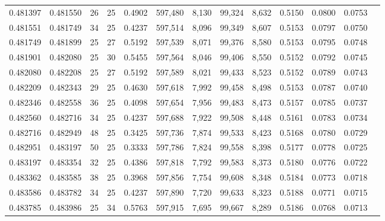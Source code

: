 \begin{tabular}{rrrrrrrrrrrrr}
0.481397 & 0.481550 &    26 &  25 &                                     0.4902 & 597,480 &   8,130 &  99,324 &   8,632 & 0.5150 & 0.0800 & 0.0753 \\
0.481551 & 0.481749 &    34 &  25 &                                     0.4237 & 597,514 &   8,096 &  99,349 &   8,607 & 0.5153 & 0.0797 & 0.0750 \\
0.481749 & 0.481899 &    25 &  27 &                                     0.5192 & 597,539 &   8,071 &  99,376 &   8,580 & 0.5153 & 0.0795 & 0.0748 \\
0.481901 & 0.482080 &    25 &  30 &                                     0.5455 & 597,564 &   8,046 &  99,406 &   8,550 & 0.5152 & 0.0792 & 0.0745 \\
0.482080 & 0.482208 &    25 &  27 &                                     0.5192 & 597,589 &   8,021 &  99,433 &   8,523 & 0.5152 & 0.0789 & 0.0743 \\
0.482209 & 0.482343 &    29 &  25 &                                     0.4630 & 597,618 &   7,992 &  99,458 &   8,498 & 0.5153 & 0.0787 & 0.0740 \\
0.482346 & 0.482558 &    36 &  25 &                                     0.4098 & 597,654 &   7,956 &  99,483 &   8,473 & 0.5157 & 0.0785 & 0.0737 \\
0.482560 & 0.482716 &    34 &  25 &                                     0.4237 & 597,688 &   7,922 &  99,508 &   8,448 & 0.5161 & 0.0783 & 0.0734 \\
0.482716 & 0.482949 &    48 &  25 &                                     0.3425 & 597,736 &   7,874 &  99,533 &   8,423 & 0.5168 & 0.0780 & 0.0729 \\
0.482951 & 0.483197 &    50 &  25 &                                     0.3333 & 597,786 &   7,824 &  99,558 &   8,398 & 0.5177 & 0.0778 & 0.0725 \\
0.483197 & 0.483354 &    32 &  25 &                                     0.4386 & 597,818 &   7,792 &  99,583 &   8,373 & 0.5180 & 0.0776 & 0.0722 \\
0.483362 & 0.483585 &    38 &  25 &                                     0.3968 & 597,856 &   7,754 &  99,608 &   8,348 & 0.5184 & 0.0773 & 0.0718 \\
0.483586 & 0.483782 &    34 &  25 &                                     0.4237 & 597,890 &   7,720 &  99,633 &   8,323 & 0.5188 & 0.0771 & 0.0715 \\
0.483785 & 0.483986 &    25 &  34 &                                     0.5763 & 597,915 &   7,695 &  99,667 &   8,289 & 0.5186 & 0.0768 & 0.0713 \\

\end{tabular}
